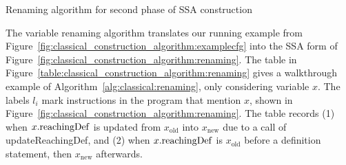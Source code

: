 {\begin{algorithm}
\caption{\label{alg:classical:renaming}Renaming algorithm for second
  phase of SSA construction}
\end{algorithm}

The variable renaming algorithm translates our running example 
from Figure~\ref{fig:classical_construction_algorithm:examplecfg}
into the SSA form of Figure~\ref{fig:classical_construction_algorithm:renaming}. 
The table in Figure~\ref{table:classical_construction_algorithm:renaming} 
gives a walkthrough example of Algorithm~\ref{alg:classical:renaming},
only considering variable $x$. The labels $l_i$ mark
instructions in the program that mention $x$, shown in 
Figure~\ref{fig:classical_construction_algorithm:renaming}.
The table records (1) when $x.\mathrm{reachingDef}$ is updated
from $x_\mathrm{old}$ into
$x_\mathrm{new}$ due to a call of updateReachingDef,
and (2) when $x.\mathrm{reachingDef}$ is $x_\mathrm{old}$ before
a definition statement, then $x_\mathrm{new}$ afterwards.

}

